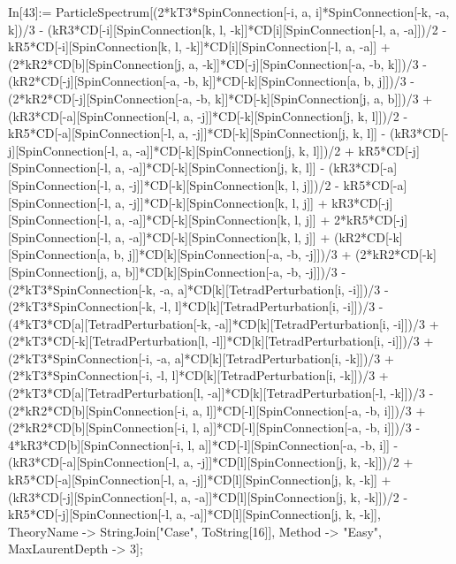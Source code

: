 In[43]:= ParticleSpectrum[(2*kT3*SpinConnection[-i, a, i]*SpinConnection[-k, -a, k])/3 - (kR3*CD[-i][SpinConnection[k, l, -k]]*CD[i][SpinConnection[-l, a, -a]])/2 - kR5*CD[-i][SpinConnection[k, l, -k]]*CD[i][SpinConnection[-l, a, -a]] + (2*kR2*CD[b][SpinConnection[j, a, -k]]*CD[-j][SpinConnection[-a, -b, k]])/3 - (kR2*CD[-j][SpinConnection[-a, -b, k]]*CD[-k][SpinConnection[a, b, j]])/3 - (2*kR2*CD[-j][SpinConnection[-a, -b, k]]*CD[-k][SpinConnection[j, a, b]])/3 + (kR3*CD[-a][SpinConnection[-l, a, -j]]*CD[-k][SpinConnection[j, k, l]])/2 - kR5*CD[-a][SpinConnection[-l, a, -j]]*CD[-k][SpinConnection[j, k, l]] - (kR3*CD[-j][SpinConnection[-l, a, -a]]*CD[-k][SpinConnection[j, k, l]])/2 + kR5*CD[-j][SpinConnection[-l, a, -a]]*CD[-k][SpinConnection[j, k, l]] - (kR3*CD[-a][SpinConnection[-l, a, -j]]*CD[-k][SpinConnection[k, l, j]])/2 - kR5*CD[-a][SpinConnection[-l, a, -j]]*CD[-k][SpinConnection[k, l, j]] + kR3*CD[-j][SpinConnection[-l, a, -a]]*CD[-k][SpinConnection[k, l, j]] + 2*kR5*CD[-j][SpinConnection[-l, a, -a]]*CD[-k][SpinConnection[k, l, j]] + (kR2*CD[-k][SpinConnection[a, b, j]]*CD[k][SpinConnection[-a, -b, -j]])/3 + (2*kR2*CD[-k][SpinConnection[j, a, b]]*CD[k][SpinConnection[-a, -b, -j]])/3 - (2*kT3*SpinConnection[-k, -a, a]*CD[k][TetradPerturbation[i, -i]])/3 - (2*kT3*SpinConnection[-k, -l, l]*CD[k][TetradPerturbation[i, -i]])/3 - (4*kT3*CD[a][TetradPerturbation[-k, -a]]*CD[k][TetradPerturbation[i, -i]])/3 + (2*kT3*CD[-k][TetradPerturbation[l, -l]]*CD[k][TetradPerturbation[i, -i]])/3 + (2*kT3*SpinConnection[-i, -a, a]*CD[k][TetradPerturbation[i, -k]])/3 + (2*kT3*SpinConnection[-i, -l, l]*CD[k][TetradPerturbation[i, -k]])/3 + (2*kT3*CD[a][TetradPerturbation[l, -a]]*CD[k][TetradPerturbation[-l, -k]])/3 - (2*kR2*CD[b][SpinConnection[-i, a, l]]*CD[-l][SpinConnection[-a, -b, i]])/3 + (2*kR2*CD[b][SpinConnection[-i, l, a]]*CD[-l][SpinConnection[-a, -b, i]])/3 - 4*kR3*CD[b][SpinConnection[-i, l, a]]*CD[-l][SpinConnection[-a, -b, i]] - (kR3*CD[-a][SpinConnection[-l, a, -j]]*CD[l][SpinConnection[j, k, -k]])/2 + kR5*CD[-a][SpinConnection[-l, a, -j]]*CD[l][SpinConnection[j, k, -k]] + (kR3*CD[-j][SpinConnection[-l, a, -a]]*CD[l][SpinConnection[j, k, -k]])/2 - kR5*CD[-j][SpinConnection[-l, a, -a]]*CD[l][SpinConnection[j, k, -k]], TheoryName -> StringJoin["Case", ToString[16]], Method -> "Easy", MaxLaurentDepth -> 3]; 